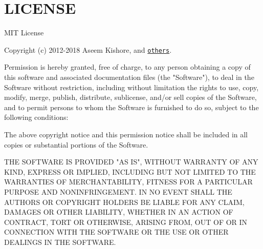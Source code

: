 \chapter{LICENSE }
\hypertarget{md__c_1_2xampp_2htdocs_2_g_pagos_ayuntamiento_2node__modules_2json5_2_l_i_c_e_n_s_e}{}\label{md__c_1_2xampp_2htdocs_2_g_pagos_ayuntamiento_2node__modules_2json5_2_l_i_c_e_n_s_e}
MIT License

Copyright (c) 2012-\/2018 Aseem Kishore, and \href{https://github.com/json5/json5/contributors}{\texttt{others}}.

Permission is hereby granted, free of charge, to any person obtaining a copy of this software and associated documentation files (the "{}\+Software"{}), to deal in the Software without restriction, including without limitation the rights to use, copy, modify, merge, publish, distribute, sublicense, and/or sell copies of the Software, and to permit persons to whom the Software is furnished to do so, subject to the following conditions\+:

The above copyright notice and this permission notice shall be included in all copies or substantial portions of the Software.

THE SOFTWARE IS PROVIDED "{}\+AS IS"{}, WITHOUT WARRANTY OF ANY KIND, EXPRESS OR IMPLIED, INCLUDING BUT NOT LIMITED TO THE WARRANTIES OF MERCHANTABILITY, FITNESS FOR A PARTICULAR PURPOSE AND NONINFRINGEMENT. IN NO EVENT SHALL THE AUTHORS OR COPYRIGHT HOLDERS BE LIABLE FOR ANY CLAIM, DAMAGES OR OTHER LIABILITY, WHETHER IN AN ACTION OF CONTRACT, TORT OR OTHERWISE, ARISING FROM, OUT OF OR IN CONNECTION WITH THE SOFTWARE OR THE USE OR OTHER DEALINGS IN THE SOFTWARE. 